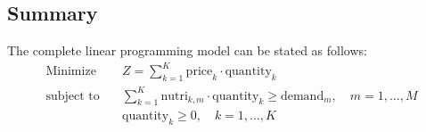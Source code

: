 \documentclass{article}
\begin{document}
\subsection*{Summary}
The complete linear programming model can be stated as follows:
\begin{align*}
    \text{Minimize} & \quad Z = \sum_{k=1}^{K} \text{price}_k \cdot \text{quantity}_k \\
    \text{subject to} & \quad \sum_{k=1}^{K} \text{nutri}_{k,m} \cdot \text{quantity}_k \geq \text{demand}_m, \quad m = 1, \ldots, M \\
    & \quad \text{quantity}_k \geq 0, \quad k = 1, \ldots, K 
\end{align*}
\end{document}
